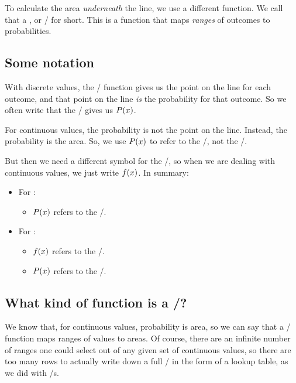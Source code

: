 \documentclass[../../../main.tex]{subfiles}
\begin{document}
To calculate the area \emph{underneath} the line, we use a different function. We call that a , or \CDFtext/ for short. This is a function that maps \emph{ranges} of outcomes to probabilities. 


\subsection{Some notation}

With discrete values, the \PDFtext/ function gives us the point on the line for each outcome, and that point on the line \emph{is} the probability for that outcome. So we often write that the \PDFtext/ gives us $\Probability{\RandVarVal/}$.

For continuous values, the probability is not the point on the line. Instead, the probability is the area. So, we use $\Probability{\RandVarVal/}$ to refer to the \CDFtext/, not the \PDFtext/. 

But then we need a different symbol for the \PDFtext/, so when we are dealing with continuous values, we just write $\ContProb{\RandVarVal/}$. In summary:

\begin{itemize}
  \item For :
    \begin{itemize}
      \item $\Probability{\RandVarVal/}$ refers to the \PDFtext/.
    \end{itemize}
  \item For :
    \begin{itemize}
      \item $\ContProb{\RandVarVal/}$ refers to the \PDFtext/.
      \item $\Probability{\RandVarVal/}$ refers to the \CDFtext/.
    \end{itemize}
\end{itemize}


\subsection{What kind of function is a \CDFtext/?}

We know that, for continuous values, probability is area, so we can say that a \CDFtext/ function maps ranges of values to areas. Of course, there are an infinite number of ranges one could select out of any given set of continuous values, so there are too many rows to actually write down a full \CDFtext/ in the form of a lookup table, as we did with \PDFtext/s. 
\end{document}
